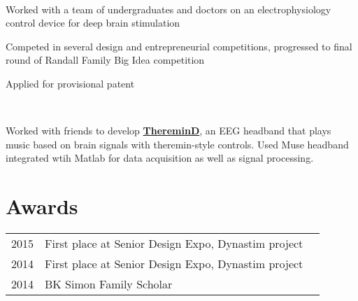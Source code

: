 \documentclass[]{deedy-resume-openfont}
\begin{document}
\begin{minipage}[t]{0.66\textwidth}
 \\
\begin{tightemize}\item Worked with a team of undergraduates and doctors on an
electrophysiology control device for deep brain stimulation
\item Competed in several design and entrepreneurial competitions, progressed to final round of Randall Family Big Idea competition
\item Applied for provisional patent
\end{tightemize}
\sectionsep

 \\
\begin{tightemize}\item Worked with friends to develop \textbf{\href{http://devpost.com/software/theremind}{ThereminD}}, an EEG headband that plays music based on brain signals with theremin-style controls. Used Muse headband integrated wtih Matlab for data acquisition as well as signal processing.
\end{tightemize}
\sectionsep


\section{Awards} 
\begin{tabular}{rll}
2015         & First place at Senior Design Expo, Dynastim project\\
2014	     & First place at Senior Design Expo, Dynastim project\\
2014	     & BK Simon Family Scholar
\end{tabular}
\sectionsep

\end{minipage} 
\end{document}
